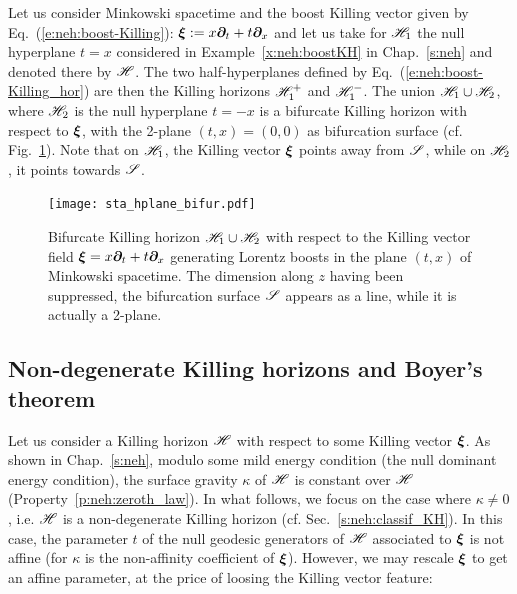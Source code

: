 \begin{example}
\label{x:sta:bif-KH-boost}
Let us consider Minkowski spacetime and the boost Killing vector given
by Eq.~(\ref{e:neh:boost-Killing}): $\bm{\xi} := x \bm{\partial}_t + t \bm{\partial}_x$
and let us take for $\mathscr{H}_1$ the null hyperplane $t=x$
considered in Example~\ref{x:neh:boostKH} in Chap.~\ref{s:neh} and denoted there
by $\mathscr{H}$. The two half-hyperplanes defined by
Eq.~(\ref{e:neh:boost-Killing_hor}) are then the Killing horizons $\mathscr{H}_1^+$ and
$\mathscr{H}_1^-$. The union $\mathscr{H}_1 \cup \mathscr{H}_2$, where $\mathscr{H}_2$ is the null hyperplane $t=-x$ is a bifurcate Killing horizon with respect to $\bm{\xi}$,
with the 2-plane $(t,x)=(0,0)$ as bifurcation surface
(cf. Fig.~\ref{f:sta:hplane_bifur}). Note that on $\mathscr{H}_1$, the Killing vector
$\bm{\xi}$ points away from $\mathscr{S}$, while on $\mathscr{H}_2$, it points towards $\mathscr{S}$.
\end{example}

\begin{figure}
\centerline{\texttt{[image: sta\_hplane\_bifur.pdf]}}
\caption[]{\label{f:sta:hplane_bifur} \footnotesize
Bifurcate Killing horizon $\mathscr{H}_1\cup\mathscr{H}_2$ with respect to the Killing vector
field $\bm{\xi} = x \bm{\partial}_t + t \bm{\partial}_x$ generating Lorentz boosts in the plane $(t,x)$ of Minkowski spacetime. The dimension along $z$ having been suppressed, the bifurcation
surface $\mathscr{S}$ appears as a line, while it is actually a 2-plane.}
\end{figure}



\subsection{Non-degenerate Killing horizons and Boyer's theorem}
\label{s:sta:non-degenerate_KH}

Let us consider a Killing horizon $\mathscr{H}$ with respect to some Killing vector
$\bm{\xi}$. As shown in Chap.~\ref{s:neh},
modulo some mild energy condition (the null dominant energy condition),
the surface gravity $\kappa$ of $\mathscr{H}$
is constant over $\mathscr{H}$ (Property~\ref{p:neh:zeroth_law}).
In what follows, we focus on the case where $\kappa\neq 0$, i.e. $\mathscr{H}$
is a non-degenerate Killing horizon (cf. Sec.~\ref{s:neh:classif_KH}).
In this case, the parameter $t$ of the null geodesic generators of $\mathscr{H}$
associated to $\bm{\xi}$ is not affine
(for $\kappa$ is the non-affinity coefficient
of $\bm{\xi}$). However, we may
rescale $\bm{\xi}$ to get an affine parameter, at the price of loosing
the Killing vector feature:


